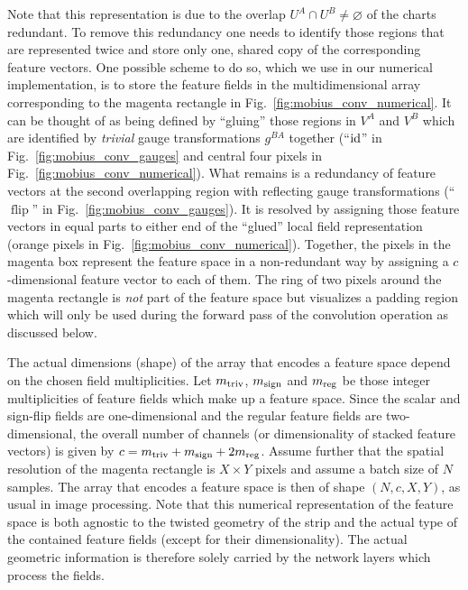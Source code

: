 Note that this representation is due to the overlap $U^A \cap U^B \neq \varnothing$ of the charts redundant.
To remove this redundancy one needs to identify those regions that are represented twice and store only one, shared copy of the corresponding feature vectors.
One possible scheme to do so, which we use in our numerical implementation, is to store the feature fields in the multidimensional array corresponding to the magenta rectangle in Fig.~\ref{fig:mobius_conv_numerical}.
It can be thought of as being defined by ``gluing'' those regions in $V^A$ and $V^B$ which are identified by \emph{trivial} gauge transformations $g^{BA}$ together (``$\mathrm{id}$'' in Fig.~\ref{fig:mobius_conv_gauges} and central four pixels in Fig.~\ref{fig:mobius_conv_numerical}).
What remains is a redundancy of feature vectors at the second overlapping region with reflecting gauge transformations (``$\operatorname{flip}$'' in Fig.~\ref{fig:mobius_conv_gauges}).
It is resolved by assigning those feature vectors in equal parts to either end of the ``glued'' local field representation (orange pixels in Fig.~\ref{fig:mobius_conv_numerical}).
Together, the pixels in the magenta box represent the feature space in a non-redundant way by assigning a $c$-dimensional feature vector to each of them.
The ring of two pixels around the magenta rectangle is \emph{not} part of the feature space but visualizes a padding region which will only be used during the forward pass of the convolution operation as discussed below.

The actual dimensions (shape) of the array that encodes a feature space depend on the chosen field multiplicities.
Let $m_{\textup{triv}}$, $m_{\textup{sign}}$ and $m_{\textup{reg}}$ be those integer multiplicities of feature fields which make up a feature space.
Since the scalar and sign-flip fields are one-dimensional and the regular feature fields are two-dimensional, the overall number of channels (or dimensionality of stacked feature vectors) is given by $c = m_{\textup{triv}} + m_{\textup{sign}} + 2 m_{\textup{reg}}$.
Assume further that the spatial resolution of the magenta rectangle is $X\times Y$ pixels and assume a batch size of $N$ samples.
The array that encodes a feature space is then of shape $(N,c,X,Y)$, as usual in image processing.
Note that this numerical representation of the feature space is both agnostic to the twisted geometry of the strip and the actual type of the contained feature fields (except for their dimensionality).
The actual geometric information is therefore solely carried by the network layers which process the fields.





